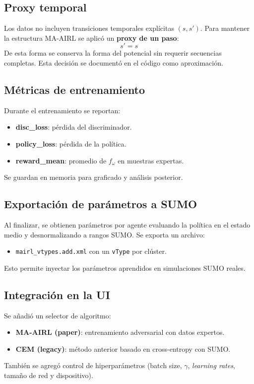 \subsection{Proxy temporal}
Los datos no incluyen transiciones temporales explícitas $(s,s')$. Para mantener la estructura MA-AIRL se aplicó un \textbf{proxy de un paso}:
\[
s' = s
\]
De esta forma se conserva la forma del potencial sin requerir secuencias completas. Esta decisión se documentó en el código como aproximación.

\subsection{Métricas de entrenamiento}
Durante el entrenamiento se reportan:
\begin{itemize}
\item \textbf{disc\_loss}: pérdida del discriminador.
\item \textbf{policy\_loss}: pérdida de la política.
\item \textbf{reward\_mean}: promedio de $f_\omega$ en muestras expertas.
\end{itemize}
Se guardan en memoria para graficado y análisis posterior.

\subsection{Exportación de parámetros a SUMO}
Al finalizar, se obtienen parámetros por agente evaluando la política en el estado medio y desnormalizando a rangos SUMO. Se exporta un archivo:
\begin{itemize}
\item \texttt{mairl\_vtypes.add.xml} con un \texttt{vType} por clúster.
\end{itemize}
Esto permite inyectar los parámetros aprendidos en simulaciones SUMO reales.

\subsection{Integración en la UI}
Se añadió un selector de algoritmo:
\begin{itemize}
\item \textbf{MA-AIRL (paper)}: entrenamiento adversarial con datos expertos.
\item \textbf{CEM (legacy)}: método anterior basado en cross-entropy con SUMO.
\end{itemize}
También se agregó control de hiperparámetros (batch size, $\gamma$, \textit{learning rates}, tamaño de red y dispositivo).

